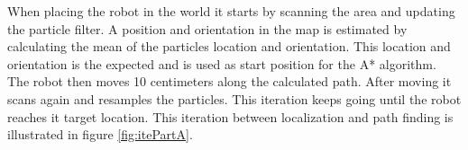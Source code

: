 \FloatBarrier
When placing the robot in the world it starts by scanning the area and updating the particle filter. A position and orientation in the map is estimated by calculating the mean of the particles location and orientation. This location and orientation is the expected and is used as start position for the A* algorithm. The robot then moves 10 centimeters along the calculated path. After moving it scans again and resamples the particles. This iteration keeps going until the robot reaches it target location. This iteration between localization and path finding is illustrated in figure \ref{fig:itePartA}. 


